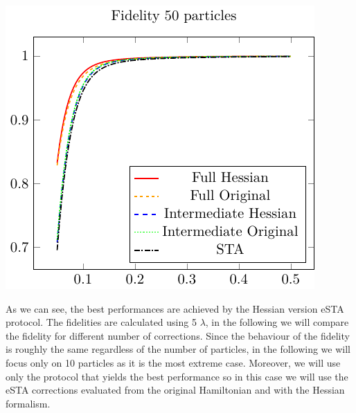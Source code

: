 \centering
\includegraphics{./gfx/fidelity_np50_nlambda5.pdf}

As we can see, the best performances are achieved by the Hessian version eSTA protocol.
The fidelities are calculated using 5 $ \lambda $, in the following we will compare the fidelity for different number of corrections.
Since the behaviour of the fidelity is roughly the same regardless of the number of particles, in the following we will focus only on 10 particles as it is the most extreme case.
Moreover, we will use only the protocol that yields the best performance so in this case we will use the eSTA corrections evaluated from the original Hamiltonian and with the Hessian formalism.

